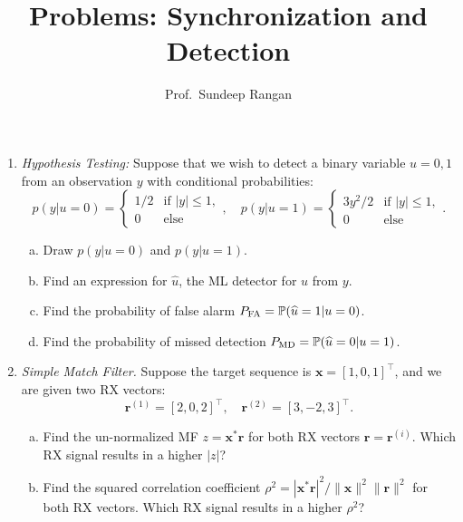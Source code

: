 \documentclass[11pt]{article}
\def\Prob{{\mathbb{P}}}
\newcommand{\wh}[1]{\widehat{#1}}
\newcommand{\rbf}{\boldsymbol{r}}
\newcommand{\xbf}{\boldsymbol{x}}
\begin{document}
\title{Problems:  Synchronization and Detection}
\author{Prof.\ Sundeep Rangan}
\date{}

\maketitle

\begin{enumerate}

\item \label{prob:hyp} \emph{Hypothesis Testing:}  Suppose that we wish to detect a binary variable $u=0,1$ from 
an observation $y$ with conditional probabilities:
\[
    p(y|u=0) = \begin{cases} 
        1/2 & \mbox{if } |y| \leq 1, \\
        0   & \mbox{else}
        \end{cases},
    \quad
    p(y|u=1) = \begin{cases}
        3y^2/2 & \mbox{if } |y| \leq 1, \\
        0   & \mbox{else}
        \end{cases}.        
\]
\begin{enumerate}[(a)]
\item Draw $p(y|u=0)$ and $p(y|u=1)$.
\item Find an expression for $\wh{u}$, the ML detector for $u$ from $y$.
\item Find the probability of false alarm $P_{\rm FA} = \Prob(\wh{u}=1|u=0)$.
\item Find the probability of missed detection $P_{\rm MD} = \Prob(\wh{u}=0|u=1)$.
\end{enumerate}


\item \emph{Simple Match Filter.}  Suppose the target sequence is $\xbf=[1,0,1]^\intercal$,
and we are given two RX vectors:
\[
    \rbf^{(1)}=[2,0,2]^\intercal, \quad 
    \rbf^{(2)}=[3,-2,3]^\intercal.
\]
\begin{enumerate}[(a)]
\item Find the un-normalized MF $z = \xbf^*\rbf$ 
for both RX vectors $\rbf = \rbf^{(i)}$.  Which RX signal results in a higher $|z|$?

\item Find the squared correlation coefficient $\rho^2 = |\xbf^*\rbf|^2/\|\xbf\|^2\|\rbf\|^2$
for both RX vectors.  Which RX signal results in a higher $\rho^2$? 

\end{enumerate}




\end{enumerate}
\end{document}
